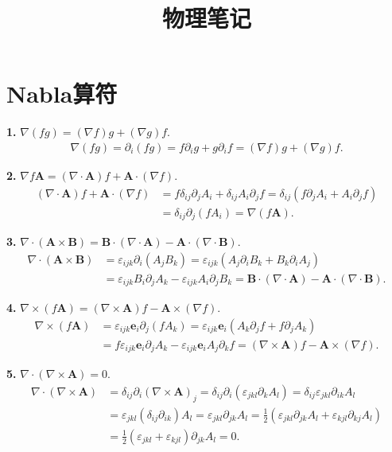 \documentclass{article}
\title{物理笔记}
\author{}
\date{}
\newcommand\del{\partial}
\newcommand\bo[1]{\boldsymbol{#1}}
\begin{document}
\maketitle

\section{Nabla算符}

\textbf{1. }$\nabla (fg)=(\nabla f)g+(\nabla g)f$.
\begin{align*}
\nabla (fg)=\del_i(fg)=f\del_i g+g\del_i f=(\nabla f)g+(\nabla g)f.
\end{align*}\par

\textbf{2. }$\nabla f\bo{A}=(\nabla\cdot\bo{A})f+\bo{A}\cdot(\nabla f)$.
\begin{align*}
(\nabla\cdot\bo{A})f+\bo{A}\cdot(\nabla f)&=f\delta_{ij}\del_j A_i+\delta_{ij}A_i\del_j f=\delta_{ij}\left(f\del_j A_i+A_i\del_j f\right)\\
&=\delta_{ij}\del_j(fA_i)=\nabla(f\bo{A}).
\end{align*}

\textbf{3. }$\nabla\cdot(\bo{A}\times\bo{B})=\bo{B}\cdot(\nabla\cdot\bo{A})-\bo{A}\cdot(\nabla\cdot\bo{B})$.
\begin{align*}
\nabla\cdot(\bo{A}\times\bo{B})&=\varepsilon_{ijk}\del_i\left(A_jB_k\right)=\varepsilon_{ijk}(A_j\del_i B_k+B_k\del_i A_j)\\
&=\varepsilon_{ijk}B_i\del_jA_k-\varepsilon_{ijk}A_i\del_jB_k=\bo{B}\cdot(\nabla\cdot\bo{A})-\bo{A}\cdot(\nabla\cdot\bo{B}).
\end{align*}

\textbf{4. }$\nabla\times(f\bo{A})=(\nabla\times\bo{A})f-\bo{A}\times(\nabla f)$.
\begin{align*}
\nabla\times(f\bo{A})&=\varepsilon_{ijk}\bo{e}_i\del_j(fA_k)=\varepsilon_{ijk}\bo{e}_i(A_k\del_j f+f\del_j A_k)\\
&=f\varepsilon_{ijk}\bo{e}_i\del_jA_k-\varepsilon_{ijk}\bo{e}_iA_j\del_k f=(\nabla\times\bo{A})f-\bo{A}\times(\nabla f).
\end{align*}

\textbf{5. }$\nabla\cdot(\nabla\times\bo{A})=0$.
\begin{align*}
\nabla\cdot(\nabla\times\bo{A})&=\delta_{ij}\del_i(\nabla\times\bo{A})_j=\delta_{ij}\del_i(\varepsilon_{jkl}\del_k A_l)=\delta_{ij}\varepsilon_{jkl}\del_{ik}A_l\\
&=\varepsilon_{jkl}(\delta_{ij}\del_{ik})A_l=\varepsilon_{jkl}\del_{jk}A_l=\frac12(\varepsilon_{jkl}\del_{jk}A_l+\varepsilon_{kjl}\del_{kj}A_l)\\
&=\frac12(\varepsilon_{jkl}+\varepsilon_{kjl})\del_{jk}A_l=0.
\end{align*}
\end{document}
